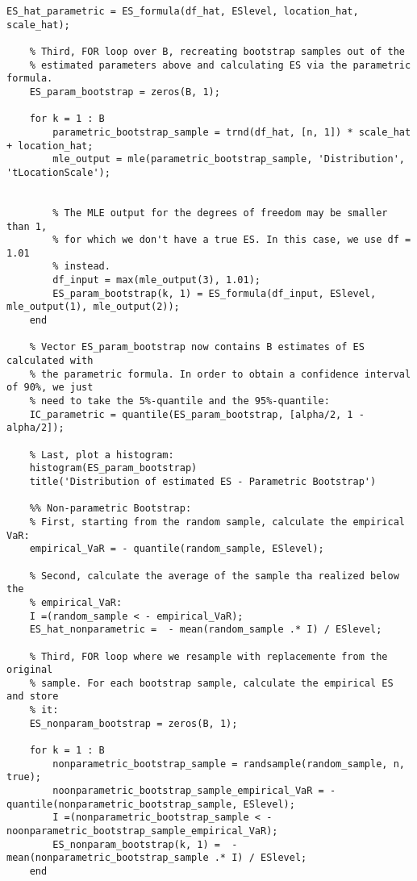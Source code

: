 \documentclass[11pt, a4paper]{article}
\begin{document}
\begin{lstlisting}[style=Matlab-editor]
    ES_hat_parametric = ES_formula(df_hat, ESlevel, location_hat, scale_hat);
    
    % Third, FOR loop over B, recreating bootstrap samples out of the
    % estimated parameters above and calculating ES via the parametric formula. 
    ES_param_bootstrap = zeros(B, 1);
    
    for k = 1 : B
        parametric_bootstrap_sample = trnd(df_hat, [n, 1]) * scale_hat + location_hat;
        mle_output = mle(parametric_bootstrap_sample, 'Distribution', 'tLocationScale');
        
        
        % The MLE output for the degrees of freedom may be smaller than 1,     
        % for which we don't have a true ES. In this case, we use df = 1.01
        % instead.
        df_input = max(mle_output(3), 1.01);                                        
        ES_param_bootstrap(k, 1) = ES_formula(df_input, ESlevel, mle_output(1), mle_output(2));
    end
    
    % Vector ES_param_bootstrap now contains B estimates of ES calculated with
    % the parametric formula. In order to obtain a confidence interval of 90%, we just
    % need to take the 5%-quantile and the 95%-quantile:
    IC_parametric = quantile(ES_param_bootstrap, [alpha/2, 1 - alpha/2]);
    
    % Last, plot a histogram:
    histogram(ES_param_bootstrap)
    title('Distribution of estimated ES - Parametric Bootstrap')
    
    %% Non-parametric Bootstrap:
    % First, starting from the random sample, calculate the empirical VaR:
    empirical_VaR = - quantile(random_sample, ESlevel);
    
    % Second, calculate the average of the sample tha realized below the
    % empirical_VaR:
    I =(random_sample < - empirical_VaR);
    ES_hat_nonparametric =  - mean(random_sample .* I) / ESlevel;
    
    % Third, FOR loop where we resample with replacemente from the original
    % sample. For each bootstrap sample, calculate the empirical ES and store
    % it:
    ES_nonparam_bootstrap = zeros(B, 1);
    
    for k = 1 : B
        nonparametric_bootstrap_sample = randsample(random_sample, n, true);
        noonparametric_bootstrap_sample_empirical_VaR = - quantile(nonparametric_bootstrap_sample, ESlevel);
        I =(nonparametric_bootstrap_sample < - noonparametric_bootstrap_sample_empirical_VaR);
        ES_nonparam_bootstrap(k, 1) =  - mean(nonparametric_bootstrap_sample .* I) / ESlevel;
    end
    

\end{lstlisting}
\end{document}

